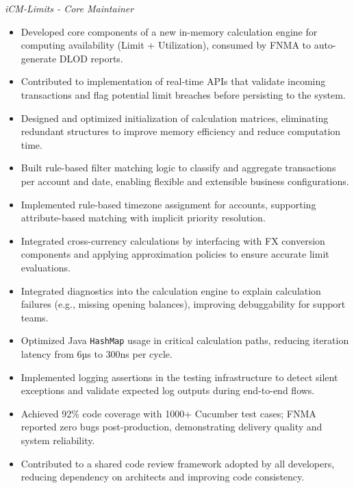 \documentclass[a4paper,10pt]{article}
\newcommand{\cvHeaderThree}[1]{%
  \noindent\textit{#1}%
}
\newenvironment{cvItemList}{%
  \begin{itemize}%
    \setlength{\itemsep}{0.1em}%
    \setlength{\topsep}{0em}%
    \setlength{\partopsep}{0em}%
    \setlength{\parsep}{0em}%
    \setlength{\parskip}{0em}%
}{%
  \end{itemize}%
}
\begin{document}
\cvHeaderThree{iCM-Limits - Core Maintainer}
\begin{cvItemList}
  \item Developed core components of a new in-memory calculation engine for computing availability (Limit + Utilization), consumed by FNMA to auto-generate DLOD reports.
  \item Contributed to implementation of real-time APIs that validate incoming transactions and flag potential limit breaches before persisting to the system.
  \item Designed and optimized initialization of calculation matrices, eliminating redundant structures to improve memory efficiency and reduce computation time.
  \item Built rule-based filter matching logic to classify and aggregate transactions per account and date, enabling flexible and extensible business configurations.
  \item Implemented rule-based timezone assignment for accounts, supporting attribute-based matching with implicit priority resolution.
  \item Integrated cross-currency calculations by interfacing with FX conversion components and applying approximation policies to ensure accurate limit evaluations.
  \item Integrated diagnostics into the calculation engine to explain calculation failures (e.g., missing opening balances), improving debuggability for support teams.
  \item Optimized Java \texttt{HashMap} usage in critical calculation paths, reducing iteration latency from 6µs to 300ns per cycle.
  \item Implemented logging assertions in the testing infrastructure to detect silent exceptions and validate expected log outputs during end-to-end flows.
  \item Achieved 92\% code coverage with 1000+ Cucumber test cases; FNMA reported zero bugs post-production, demonstrating delivery quality and system reliability.
  \item Contributed to a shared code review framework adopted by all developers, reducing dependency on architects and improving code consistency.
\end{cvItemList}
\end{document}
